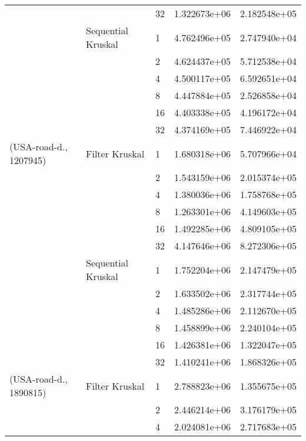 \begin{tabular}{lllrr}
                       &                    & 32 &  1.322673e+06 &  2.182548e+05 \\
                       & Sequential Kruskal & 1  &  4.762496e+05 &  2.747940e+04 \\
                       &                    & 2  &  4.624437e+05 &  5.712538e+04 \\
                       &                    & 4  &  4.500117e+05 &  6.592651e+04 \\
                       &                    & 8  &  4.447884e+05 &  2.526858e+04 \\
                       &                    & 16 &  4.403338e+05 &  4.196172e+04 \\
                       &                    & 32 &  4.374169e+05 &  7.446922e+04 \\
(USA-road-d., 1207945) & Filter Kruskal & 1  &  1.680318e+06 &  5.707966e+04 \\
                       &                    & 2  &  1.543159e+06 &  2.015374e+05 \\
                       &                    & 4  &  1.380036e+06 &  1.758768e+05 \\
                       &                    & 8  &  1.263301e+06 &  4.149603e+05 \\
                       &                    & 16 &  1.492285e+06 &  4.809105e+05 \\
                       &                    & 32 &  4.147646e+06 &  8.272306e+05 \\
                       & Sequential Kruskal & 1  &  1.752204e+06 &  2.147479e+05 \\
                       &                    & 2  &  1.633502e+06 &  2.317744e+05 \\
                       &                    & 4  &  1.485286e+06 &  2.112670e+05 \\
                       &                    & 8  &  1.458899e+06 &  2.240104e+05 \\
                       &                    & 16 &  1.426381e+06 &  1.322047e+05 \\
                       &                    & 32 &  1.410241e+06 &  1.868326e+05 \\
(USA-road-d., 1890815) & Filter Kruskal & 1  &  2.788823e+06 &  1.355675e+05 \\
                       &                    & 2  &  2.446214e+06 &  3.176179e+05 \\
                       &                    & 4  &  2.024081e+06 &  2.717683e+05 \\

\end{tabular}
